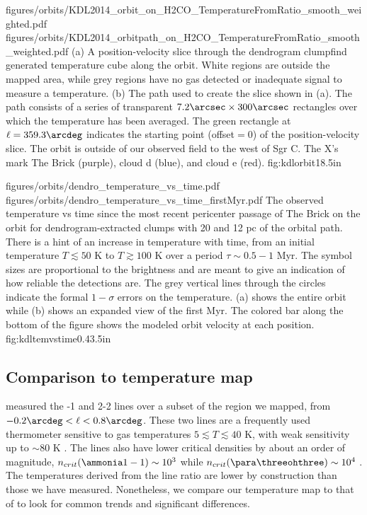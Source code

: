 \RotFigureTwoAA
{figures/orbits/KDL2014_orbit_on_H2CO_TemperatureFromRatio_smooth_weighted.pdf}
{figures/orbits/KDL2014_orbitpath_on_H2CO_TemperatureFromRatio_smooth_weighted.pdf}
{(a) A position-velocity slice through the dendrogram clumpfind generated
temperature cube along the \citet{Kruijssen2014d} orbit.  White regions are
outside the mapped area, while grey regions have no gas detected or inadequate
signal to measure a temperature.
(b) The path used to create the slice shown in (a).  The path consists of a series
of transparent $7.2\arcsec\times300\arcsec$
rectangles over which the temperature has been averaged.  The green rectangle at
$\ell=359.3\arcdeg$ indicates the starting point (offset$=0$) of the position-velocity
slice.  The orbit is outside of our observed field to the west of Sgr C.  
The X's mark The Brick (purple), cloud d (blue), and cloud e (red).
}
{fig:kdlorbit}{1}{8.5in}

\FigureTwo
{figures/orbits/dendro_temperature_vs_time.pdf}
{figures/orbits/dendro_temperature_vs_time_firstMyr.pdf}
{The observed temperature vs time since the most recent pericenter passage of
The Brick on the \citet{Kruijssen2014d} orbit for dendrogram-extracted clumps with
20 \kms and 12 pc of the orbital path.  There is a hint of an 
increase in temperature with time, from an initial temperature $T\lesssim50$ K
to $T\gtrsim100$ K over a period $\tau\sim0.5-1$ Myr.  The symbol sizes are
proportional to the \para \threeohthree brightness and are meant to give
an indication of how reliable the detections are.  The grey vertical lines
through the circles indicate the formal $1-\sigma$ errors on the temperature.
(a) shows the entire orbit
while (b) shows an expanded
view of the first Myr.  The colored bar along the bottom of the figure shows the
modeled orbit velocity at each position.}
{fig:kdltemvstime}{0.4}{3.5in}

\subsection{Comparison to \citet{Ott2014a} \ammonia temperature map}
\label{sec:ammoniacompare}
\citet{Ott2014a} measured the -1 and 2-2 lines over a subset of the
region we mapped, from $-0.2\arcdeg < \ell < 0.8\arcdeg$.  These two lines are
a frequently
used thermometer sensitive to gas temperatures $5 \lesssim T \lesssim 40$ K,
with weak sensitivity up to $\sim80$ K \citep[][Figure 1]{Mangum2013a}.  The
\ammonia lines also have lower critical densities by about an order of
magnitude, $n_{crit}(\ammonia 1-1)\sim10^3$ \percc while $n_{crit}(\para
\threeohthree)\sim10^4$ \percc \citep[Figure \ref{fig:nh3vsh2co}][]{Shirley2015a}.  The temperatures
derived from the \ammonia line ratio are lower by construction than those we have
measured.  Nonetheless, we compare our temperature map to that of
\citet{Ott2014a} to look for common trends and significant differences.

